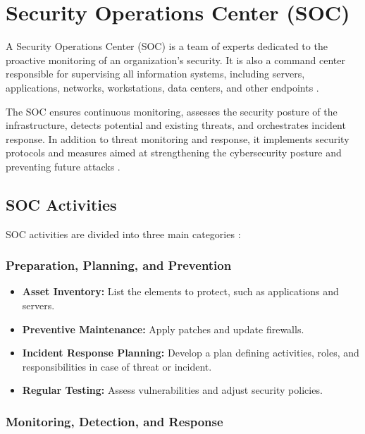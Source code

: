 \section{Security Operations Center (SOC)}
\label{sec:soc}

A Security Operations Center (SOC) is a team of experts dedicated to the proactive monitoring of an organization's security. It is also a command center responsible for supervising all information systems, including servers, applications, networks, workstations, data centers, and other endpoints \cite{ref30} \cite{ref31}.

The SOC ensures continuous monitoring, assesses the security posture of the infrastructure, detects potential and existing threats, and orchestrates incident response. In addition to threat monitoring and response, it implements security protocols and measures aimed at strengthening the cybersecurity posture and preventing future attacks \cite{ref30} \cite{ref31}.

\subsection{SOC Activities}
\label{subsec:soc-activities}

SOC activities are divided into three main categories \cite{ref32}:

\subsubsection{Preparation, Planning, and Prevention}

\begin{itemize}
    \item \textbf{Asset Inventory:} List the elements to protect, such as applications and servers.
    \item \textbf{Preventive Maintenance:} Apply patches and update firewalls.
    \item \textbf{Incident Response Planning:} Develop a plan defining activities, roles, and responsibilities in case of threat or incident.
    \item \textbf{Regular Testing:} Assess vulnerabilities and adjust security policies.
\end{itemize}

\subsubsection{Monitoring, Detection, and Response}

